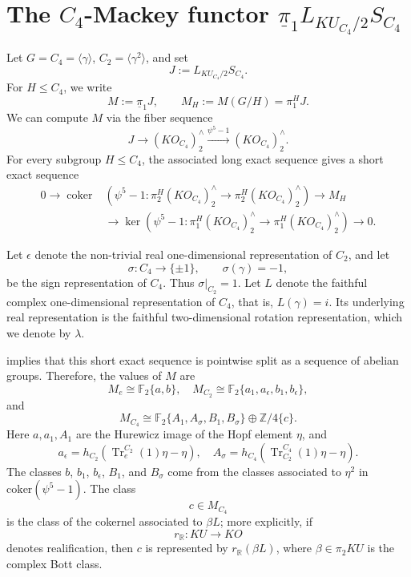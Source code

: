 \documentclass{amsart}
\theoremstyle{plain}
\theoremstyle{definition}
\theoremstyle{remark}
\begin{document}
\appendix
\section{The $C_4$-Mackey functor $\underline{\pi}_1 L_{KU_{C_4}/2}S_{C_4}$}\label{sec:C4}
Let $G=C_4=\langle \gamma\rangle$, $C_2=\langle \gamma^2\rangle$,
and set
\[
J:=L_{KU_{C_4}/2}S_{C_4}.
\]
For $H\leq C_4$, we write
\[
M:=\underline{\pi}_1J, \qquad M_H:=M(G/H)=\pi_1^H J.
\]
We can compute $M$ via the fiber sequence
\[
J\longrightarrow (KO_{C_4})_2^{\wedge} \xrightarrow{\psi^5-1} (KO_{C_4})_2^{\wedge}.
\]
For every subgroup $H\leq C_4$, the associated long exact sequence gives a short exact sequence
\[
\begin{aligned}
   0\longrightarrow
    \operatorname{coker}&\left(\psi^5-1:\pi_2^H (KO_{C_4})_2^{\wedge} \to \pi_2^H (KO_{C_4})_2^{\wedge}     \right)  \longrightarrow M_H \\
    &\longrightarrow \ker\left(\psi^5-1:\pi_1^H (KO_{C_4})_2^{\wedge} \to \pi_1^H (KO_{C_4})_2^{\wedge} \right) \longrightarrow 0.
\end{aligned}
\]

Let $\epsilon$ denote the non-trivial real one-dimensional representation of $C_2$, and let
\[
\sigma:C_4\longrightarrow \{\pm 1\}, \qquad \sigma(\gamma)=-1,
\]
be the sign representation of $C_4$. Thus $\sigma|_{C_2}=1$. Let $L$ denote the faithful complex one-dimensional representation of $C_4$, that is, $L(\gamma)=i$. Its underlying real representation is the faithful two-dimensional rotation representation, which we denote by $\lambda$.


 implies that this short exact sequence is pointwise split as a sequence of abelian groups. Therefore, the values of $M$ are
\[
M_e\cong \mathbb F_2\{a,b\}, \quad M_{C_2}\cong \mathbb F_2\{a_1,a_\epsilon,b_1,b_\epsilon\},
\]
and
\[
M_{C_4}\cong \mathbb F_2\{A_1,A_\sigma,B_1,B_\sigma\} \oplus \mathbb Z/4\{c\}.
\]
Here $a, a_1, A_1$ are the Hurewicz image of the Hopf element $\eta$, and 
\[
a_\epsilon=h_{C_2}(\operatorname{Tr}_e^{C_2}(1)\eta-\eta),\quad A_\sigma=h_{C_4}(\operatorname{Tr}_{C_2}^{C_4}(1)\eta-\eta).
\]
The classes $b$, $b_1$, $b_\epsilon$, $B_1$, and $B_\sigma$ come from the classes associated to $\eta^2$ in $\mathrm{coker}(\psi^5-1)$. The class
\[
c\in M_{C_4}
\]
is the class of the cokernel associated to $\beta L$; more explicitly, if
\[
r_{\mathbb R}:KU\longrightarrow KO
\]
denotes realification, then $c$ is represented by $r_{\mathbb R}(\beta L)$, where $\beta\in \pi_2KU$ is the complex Bott class. 
\end{document}

